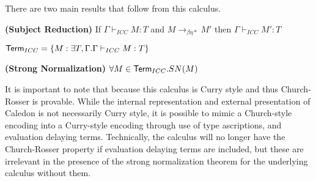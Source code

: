 There are two main results that follow from this calculus.

\begin{theorem}
\textbf{(Subject Reduction)} If $\Gamma \vdash_{ICC} M : T$ and $M \rightarrow_{\beta\eta*} M'$ then $\Gamma \vdash_{ICC} M' : T$
\end{theorem}

\begin{definition}
$ \mathsf{Term}_{ICC}  = \{ M : \exists T,\Gamma . \Gamma \vdash_{ICC} M : T \}$
\end{definition}

\begin{theorem}
\textbf{(Strong Normalization)} $\forall M \in \mathsf{Term}_{ICC}. SN(M)$
\end{theorem}

It is important to note that because this calculus is Curry style and thus Church-Rosser is provable.  
While the internal representation and external presentation of Caledon is not necessarily Curry style, 
it is possible to mimic a Church-style encoding into a Curry-style encoding through use of type ascriptions,
and evaluation delaying terms.  Technically, the calculus will no longer have the Church-Rosser property if 
evaluation delaying terms are included, but these are irrelevant in the presence of the strong normalization theorem
for the underlying calculus without them.

